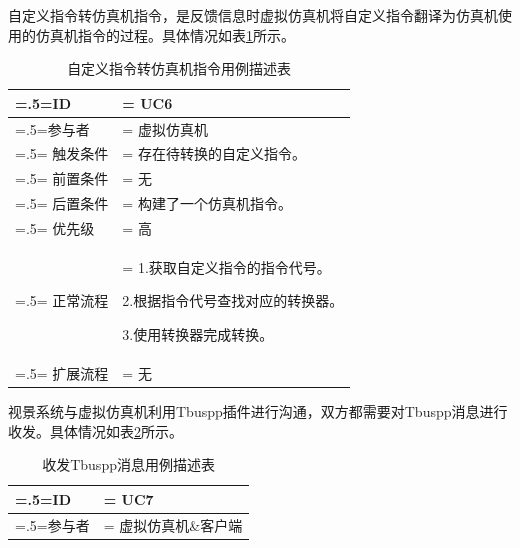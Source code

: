 {\par
自定义指令转仿真机指令，是反馈信息时虚拟仿真机将自定义指令翻译为仿真机使用的仿真机指令的过程。具体情况如表\ref{usecase6}所示。
\begin{table}[htbp]
    \begin{center}
        \caption{自定义指令转仿真机指令用例描述表}
        \label{usecase6}
        \renewcommand\arraystretch{1.5}
        \begin{tabularx}{0.8\textwidth}{ 
            | >{\centering\arraybackslash\hsize=.5\hsize\linewidth=\hsize}X 
            | >{\raggedright\arraybackslash\hsize=1.5\hsize\linewidth=\hsize}X 
            | }
            \hline
            \textbf{ID} & \textbf{UC6}\\
            \hline
            参与者 & 虚拟仿真机\\
            \hline
            触发条件 &  存在待转换的自定义指令。\\
            \hline
            前置条件 & 无\\
            \hline
            后置条件 & 构建了一个仿真机指令。\\
            \hline
            优先级 & 高\\
            \hline
            正常流程 & 1.获取自定义指令的指令代号。\par 2.根据指令代号查找对应的转换器。\par 3.使用转换器完成转换。\\
            \hline
            扩展流程 & 无\\
            \hline
        \end{tabularx}
    \end{center}
\end{table}
\par
视景系统与虚拟仿真机利用Tbuspp插件进行沟通，双方都需要对Tbuspp消息进行收发。具体情况如表\ref{usecase7}所示。
\begin{table}[htbp]
    \begin{center}
        \caption{收发Tbuspp消息用例描述表}
        \label{usecase7}
        \renewcommand\arraystretch{1.5}
        \begin{tabularx}{0.8\textwidth}{ 
            | >{\centering\arraybackslash\hsize=.5\hsize\linewidth=\hsize}X 
            | >{\raggedright\arraybackslash\hsize=1.5\hsize\linewidth=\hsize}X 
            | }
            \hline
            \textbf{ID} & \textbf{UC7}\\
            \hline
            参与者 & 虚拟仿真机\&客户端\\

\end{tabularx}
\end{center}
\end{table}}
